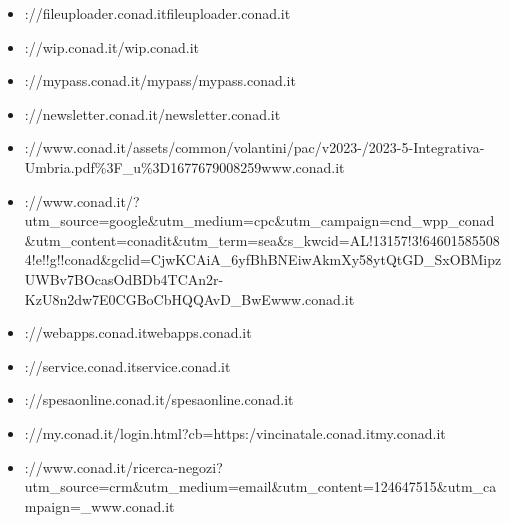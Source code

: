 \documentclass{article}
\begin{document}
\begin{itemize}
        
        
        \item \hrefhttp://fileuploader.conad.itfileuploader.conad.it
    
        
        
        \item \hrefhttp://wip.conad.it/wip.conad.it
    
        
        
        \item \hrefhttps://mypass.conad.it/mypass/mypass.conad.it
    
        
        
        \item \hrefhttps://newsletter.conad.it/newsletter.conad.it
    
        
        
        \item \hrefhttps://www.conad.it/assets/common/volantini/pac/v2023-/2023-5-Integrativa-Umbria.pdf\%3F\_u\%3D1677679008259www.conad.it
    
        
        
        \item \hrefhttps://www.conad.it/?utm\_source=google\&utm\_medium=cpc\&utm\_campaign=cnd\_wpp\_conad\&utm\_content=conadit\&utm\_term=sea\&s\_kwcid=AL!13157!3!646015855084!e!!g!!conad\&gclid=CjwKCAiA\_6yfBhBNEiwAkmXy58ytQtGD\_SxOBMipzUWBv7BOcasOdBDb4TCAn2r-KzU8n2dw7E0CGBoCbHQQAvD\_BwEwww.conad.it
    
        
        
        \item \hrefhttp://webapps.conad.itwebapps.conad.it
    
        
        
        \item \hrefhttp://service.conad.itservice.conad.it
    
        
        
        \item \hrefhttps://spesaonline.conad.it/spesaonline.conad.it
    
        
        
        \item \hrefhttps://my.conad.it/login.html?cb=https:/vincinatale.conad.itmy.conad.it
    
        
        
        \item \hrefhttps://www.conad.it/ricerca-negozi?utm\_source=crm\&utm\_medium=email\&utm\_content=124647515\&utm\_campaign=\_www.conad.it
    

\end{itemize}
\end{document}
